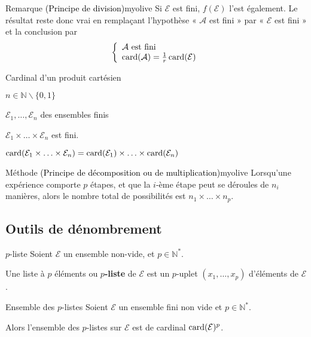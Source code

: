     \begin{omed}{Remarque \textcolor{black}{(Principe de division)}}{myolive}
        Si $\mathcal{E}$ est fini, $f(\mathcal{E})$ l’est également. Le résultat reste donc vrai en remplaçant l’hypothèse « $\mathcal{A}$ est fini » par « $\mathcal{E}$ est fini » et la conclusion par \[ \et{\mathcal{A} \text{ est fini}}{\card(\mathcal{A}) =  \frac{1}{r} \card(\mathcal{E})} \]
    \end{omed}

    \begin{prop}{Cardinal d’un produit cartésien}{}
        \begin{soient}
            \item $n \in \mathbb{N} \backslash \{ 0,1 \}$
            \item $\mathcal{E}_1,\ldots,\mathcal{E}_n$ des ensembles finis
        \end{soient}
        \begin{alors}
            \item $\mathcal{E}_1 \times \ldots \times \mathcal{E}_n$ est fini.
            \item $\operatorname{card}(\mathcal{E}_1 \times \ldots \times \mathcal{E}_n) = \operatorname{card}(\mathcal{E}_1) \times \ldots \times \operatorname{card}(\mathcal{E}_n)$
        \end{alors}
    \end{prop}

    \begin{omed}{Méthode \textcolor{black}{(Principe de décomposition ou de multiplication)}}{myolive}
        Lorsqu’une expérience comporte $p$ étapes, et que la $i$-ème étape peut se déroules de $n_i$ manières, alors le nombre total de possibilités est $n_1 \times \ldots \times n_p$.
    \end{omed}

    \subsection{Outils de dénombrement}

    \begin{defi}{$p$-liste}{}
        Soient $\mathcal{E}$ un ensemble non-vide, et $p \in \mathbb{N}^*$.

        Une liste à $p$ éléments ou \textbf{$p$-liste} de $\mathcal{E}$ est un $p$-uplet $(x_1,\ldots,x_p)$ d’éléments de $\mathcal{E}$.
    \end{defi}

    \begin{theo}{Ensemble des $p$-listes}{}
        Soient $\mathcal{E}$ un ensemble fini non vide et $p \in \mathbb{N}^*$.
    
        Alors l’ensemble des $p$-listes sur $\mathcal{E}$ est de cardinal $\operatorname{card}(\mathcal{E})^p$.
    \end{theo}

